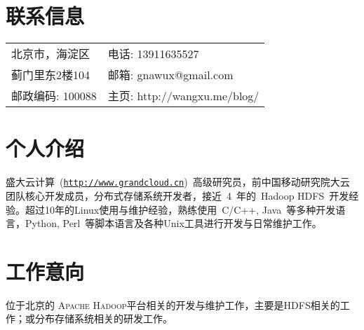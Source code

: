 \documentclass[margin,line]{res}
\newcommand{\http}{http:/\hspace{-0.3ex}/}
\begin{document}

\begin{resume}
\section{联系信息}
\vspace{.05in}
\begin{tabular}{@{}p{2in}|p{3in}}
北京市，海淀区 	   & \textsf{电话:} {13911635527}\\         
蓟门里东2楼104     & \textsf{邮箱:} {gnawux@gmail.com}\\       
邮政编码: 100088   & \textsf{主页:} {\http{}wangxu.me/blog/}\\
\end{tabular}

\section{个人介绍}

盛大云计算~(\href{http://www.grandcloud.cn}{\tt \http{}www.grandcloud.cn})~高级研究员，前中国移动研究院大云团队核心开发成员，分布式存储系统开发者，接近~4~年的~Hadoop HDFS~开发经验。超过10年的Linux使用与维护经验，熟练使用~C/C++, Java~等多种开发语言，Python, Perl~等脚本语言及各种Unix工具进行开发与日常维护工作。 

\section{工作意向}

位于北京的\textsc{ Apache Hadoop}平台相关的开发与维护工作，主要是HDFS相关的工作；或分布存储系统相关的研发工作。


\end{resume}
\end{document}
